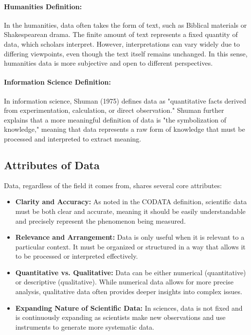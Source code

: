 \documentclass[12pt, oneside]{book}
\begin{document}
\paragraph{Humanities Definition:}
In the humanities, data often takes the form of text, such as Biblical materials or Shakespearean drama. The finite amount of text represents a fixed quantity of data, which scholars interpret. However, interpretations can vary widely due to differing viewpoints, even though the text itself remains unchanged. In this sense, humanities data is more subjective and open to different perspectives.\\
\paragraph{Information Science Definition:}
In information science, Shuman (1975) defines data as "quantitative facts derived from experimentation, calculation, or direct observation." Shuman further explains that a more meaningful definition of data is "the symbolization of knowledge," meaning that data represents a raw form of knowledge that must be processed and interpreted to extract meaning.\\
\subsection{Attributes of Data}
Data, regardless of the field it comes from, shares several core attributes:
\begin{itemize}
	\item \textbf{Clarity and Accuracy:} As noted in the CODATA definition, scientific data must be both clear and accurate, meaning it should be easily understandable and precisely represent the phenomenon being measured.
	\item \textbf{Relevance and Arrangement:} Data is only useful when it is relevant to a particular context. It must be organized or structured in a way that allows it to be processed or interpreted effectively.\\
	\item \textbf{Quantitative vs. Qualitative:} Data can be either numerical (quantitative) or descriptive (qualitative). While numerical data allows for more precise analysis, qualitative data often provides deeper insights into complex issues.\\
	\item \textbf{Expanding Nature of Scientific Data:} In sciences, data is not fixed and is continuously expanding as scientists make new observations and use instruments to generate more systematic data.
\end{itemize}
\end{document}
